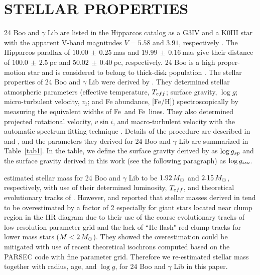 \documentclass[]{pasj01}
\begin{document}
\section{STELLAR PROPERTIES} 
24 Boo and $\gamma$ Lib are listed in the Hipparcos catalog as a G3IV and a K0III star with the apparent V-band magnitudes $V=5.58$ and $3.91$, respectively \citep{ESA1997}. 
The Hipparcos parallax of $10.00\,\pm\,0.25\>$mas and $19.99\,\pm\,0.16\>$mas \citep{van2007} give their distance of $100.0\,\pm\,2.5\>$pc and $50.02\,\pm\,0.40\>$pc, respectively.
24 Boo is a high proper-motion star and is considered to belong to thick-disk population \citep{Takeda2008}.
The stellar properties of 24 Boo and $\gamma$ Lib were derived by \citet{Takeda2008}.
They determined stellar atmospheric parameters (effective temperature, $T_{\rm eff}$; surface gravity, $\log g$; micro-turbulent velocity, $v_t$; and Fe abundance, [Fe/H]) spectroscopically by measuring the equivalent widths of Fe\, and Fe\, lines.
They also determined projected rotational velocity, $v\sin i$, and macro-turbulent velocity with the automatic spectrum-fitting technique \citep{Takeda1995}.
Details of the procedure are described in \citet{Takeda2002} and \citet{Takeda2008}, and the parameters they derived for 24 Boo and $\gamma$ Lib are summarized in Table~\ref{tab1}.
In the table, we define the surface gravity derived by \citet{Takeda2008} as $\log g_{\rm sp}$ and the surface gravity derived in this work (see the following paragraph) as $\log g_{\rm iso}$.

\citet{Takeda2008} estimated stellar mass for 24 Boo and $\gamma$ Lib to be $1.92\,M_{\Sol}$ and $2.15\,M_{\Sol}$, respectively, with use of their determined luminosity, $T_{\rm eff}$, and theoretical evolutionary tracks of \citet{Leje2001}. 
However, \citet{Takeda2015} and \citet{Takeda2016} reported that stellar masses derived in \citet{Takeda2008} tend to be overestimated by a factor of 2 especially for giant stars located near clump region in the HR diagram due to their use of the coarse evolutionary tracks of low-resolution parameter grid and the lack of ``He flash" red-clump tracks for lower mass stars ($M < 2\,M_{\Sol}$).
They showed the overestimation could be mitigated with use of recent theoretical isochrons computed based on the PARSEC code \citep{Bressan2012} with fine parameter grid.
Therefore we re-estimated stellar mass together with radius, age, and $\log g$, for 24 Boo and $\gamma$ Lib in this paper.
\end{document}
